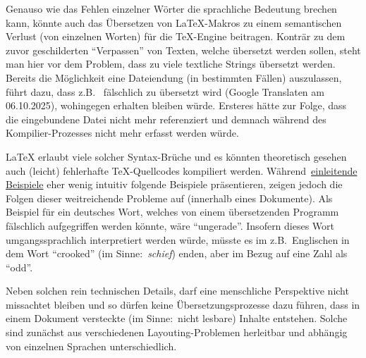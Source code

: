 Genauso wie das Fehlen einzelner Wörter die sprachliche Bedeutung brechen kann, könnte auch das Übersetzen von \LaTeX{}-Makros zu einem semantischen Verlust (von einzelnen Worten) für die \TeX{}-Engine beitragen. Konträr zu dem zuvor geschilderten \enquote{Verpassen} von Texten, welche übersetzt werden sollen, steht man hier vor dem Problem, dass zu viele textliche Strings übersetzt werden. Bereits die Möglichkeit eine Dateiendung (in bestimmten Fällen) auszulassen, führt dazu, dass z.B.\ \verb|| fälschlich zu \verb|| übersetzt wird (Google Translaten am 06.10.2025), wohingegen \verb|| erhalten bleiben würde. Ersteres hätte zur Folge, dass die eingebundene Datei nicht mehr referenziert und demnach während des Kompilier-Prozesses nicht mehr erfasst werden würde.\\\noindent 

\LaTeX{} erlaubt viele solcher Syntax-Brüche und es könnten theoretisch gesehen auch (leicht) fehlerhafte \TeX{}-Quellcodes kompiliert werden. Während~\hyperref[einleitung:hintergrund]{einleitende Beispiele} eher wenig intuitiv folgende Beispiele präsentieren, zeigen jedoch die Folgen dieser weitreichende Probleme auf (innerhalb eines Dokumente). Als Beispiel für ein deutsches Wort, welches von einem übersetzenden Programm fälschlich aufgegriffen werden könnte, wäre \enquote{ungerade}. Insofern dieses Wort umgangssprachlich interpretiert werden würde, müsste es im z.B.\ Englischen in dem Wort \enquote{crooked} (im Sinne:\ \textit{schief}) enden, aber im Bezug auf eine Zahl als \enquote{odd}.\\\noindent



Neben solchen rein technischen Details, darf eine menschliche Perspektive nicht missachtet bleiben und so dürfen keine Übersetzungsprozesse dazu führen, dass in einem Dokument versteckte (im Sinne:\ nicht lesbare) Inhalte entstehen. Solche sind zunächst aus verschiedenen Layouting-Problemen herleitbar und abhängig von einzelnen Sprachen unterschiedlich. 


